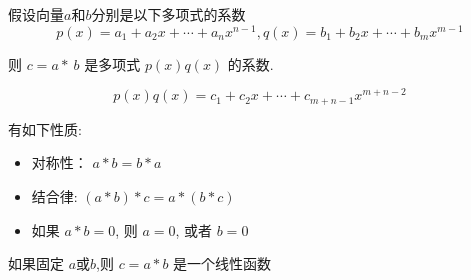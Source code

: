 \begin{example}
\end{example}

\begin{corollary}
    假设向量$a$和$b$分别是以下多项式的系数
    $$ p(x)=a_{1}+a_{2} x+\cdots+a_{n} x^{n-1}, q(x)=b_{1}+b_{2} x+\cdots+b_{m} x^{m-1} $$

    则 $ {c}={a}{*} {~b} $ 是多项式 $ p(x) q(x) $ 的系数.

    $$ p(x) q(x)=c_{1}+c_{2} x+\cdots+c_{m+n-1} x^{m+n-2} $$
\end{corollary}

\begin{corollary}[卷积性质]
    有如下性质:
    \begin{itemize}
        \item 对称性： $ a * b=b * a $
        \item 结合律: $ (a * b) * c=a *(b * c) $
        \item 如果 $ a * b=0 $, 则 $ a=0 $, 或者 $ b=0 $
    \end{itemize}
\end{corollary}

\begin{corollary}
    如果固定 $ a $或$b$,则 $ c=a * b $ 是一个线性函数
\end{corollary}

